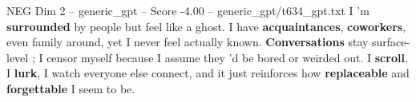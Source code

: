\begin{textsample}{NEG Dim 2 – generic\_gpt – Score -4.00 – generic\_gpt/t634\_gpt.txt}  \label{ex:f2_neg_001}
I ’m \textbf{surrounded} by people but feel like a ghost.
I have \textbf{acquaintances}, \textbf{coworkers}, even family around, yet I never feel actually known. \textbf{Conversations} stay surface-level ; I censor myself because I assume they ’d be bored or weirded out.
I \textbf{scroll}, I \textbf{lurk}, I watch everyone else connect, and it just reinforces how \textbf{replaceable} and \textbf{forgettable} I seem to be.

\end{textsample}
